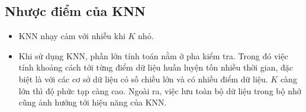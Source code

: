 \subsection{Nhược điểm của KNN}
\begin{itemize}
    \item KNN nhạy cảm với nhiễu khi $K$ nhỏ.

    \item Khi sử dụng KNN, phần lớn tính toán nằm ở pha
    kiểm tra. Trong đó việc tính khoảng cách tới {từng} điểm dữ liệu
    huấn luyện tốn nhiều thời gian, đặc biệt là với các cơ sở dữ
    liệu có số chiều lớn và có nhiều điểm dữ liệu. $K$ càng lớn thì độ phức
    tạp càng cao. Ngoài ra, việc lưu toàn bộ dữ liệu trong bộ nhớ cũng
    ảnh hưởng tới hiệu năng của KNN.

\end{itemize}









